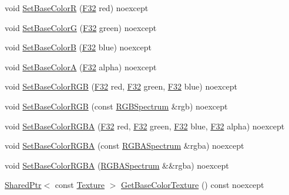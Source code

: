\begin{DoxyCompactItemize}
void \hyperlink{structmage_1_1_material_ad576d2d4a9530cce224ad5f61cacc4be}{Set\+Base\+ColorR} (\hyperlink{namespacemage_aa97e833b45f06d60a0a9c4fc22ae02c0}{F32} red) noexcept
\item 
void \hyperlink{structmage_1_1_material_a5969ee99b74e884838e991374012dcb3}{Set\+Base\+ColorG} (\hyperlink{namespacemage_aa97e833b45f06d60a0a9c4fc22ae02c0}{F32} green) noexcept
\item 
void \hyperlink{structmage_1_1_material_a703b29a7e0d31afe7781765ec6ea172e}{Set\+Base\+ColorB} (\hyperlink{namespacemage_aa97e833b45f06d60a0a9c4fc22ae02c0}{F32} blue) noexcept
\item 
void \hyperlink{structmage_1_1_material_a0acb6bb48a964d61199cf0f022e900fa}{Set\+Base\+ColorA} (\hyperlink{namespacemage_aa97e833b45f06d60a0a9c4fc22ae02c0}{F32} alpha) noexcept
\item 
void \hyperlink{structmage_1_1_material_add2b411290e7ec1425141ee11c16e210}{Set\+Base\+Color\+R\+GB} (\hyperlink{namespacemage_aa97e833b45f06d60a0a9c4fc22ae02c0}{F32} red, \hyperlink{namespacemage_aa97e833b45f06d60a0a9c4fc22ae02c0}{F32} green, \hyperlink{namespacemage_aa97e833b45f06d60a0a9c4fc22ae02c0}{F32} blue) noexcept
\item 
void \hyperlink{structmage_1_1_material_a50ff221116500c926ddbe8426948233e}{Set\+Base\+Color\+R\+GB} (const \hyperlink{structmage_1_1_r_g_b_spectrum}{R\+G\+B\+Spectrum} \&rgb) noexcept
\item 
void \hyperlink{structmage_1_1_material_a7bc1219bcdd57991abe579e06eb60649}{Set\+Base\+Color\+R\+G\+BA} (\hyperlink{namespacemage_aa97e833b45f06d60a0a9c4fc22ae02c0}{F32} red, \hyperlink{namespacemage_aa97e833b45f06d60a0a9c4fc22ae02c0}{F32} green, \hyperlink{namespacemage_aa97e833b45f06d60a0a9c4fc22ae02c0}{F32} blue, \hyperlink{namespacemage_aa97e833b45f06d60a0a9c4fc22ae02c0}{F32} alpha) noexcept
\item 
void \hyperlink{structmage_1_1_material_ae5a30123dab745249b2b81fbc9b88d64}{Set\+Base\+Color\+R\+G\+BA} (const \hyperlink{structmage_1_1_r_g_b_a_spectrum}{R\+G\+B\+A\+Spectrum} \&rgba) noexcept
\item 
void \hyperlink{structmage_1_1_material_af73f5cc47452a5a265c7c70136fae506}{Set\+Base\+Color\+R\+G\+BA} (\hyperlink{structmage_1_1_r_g_b_a_spectrum}{R\+G\+B\+A\+Spectrum} \&\&rgba) noexcept
\item 
\hyperlink{namespacemage_a1e01ae66713838a7a67d30e44c67703e}{Shared\+Ptr}$<$ const \hyperlink{classmage_1_1_texture}{Texture} $>$ \hyperlink{structmage_1_1_material_a76b84c808a281589d60ebbe2e2932c01}{Get\+Base\+Color\+Texture} () const noexcept

\end{DoxyCompactItemize}
